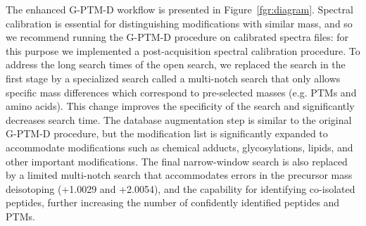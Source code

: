 \documentclass[journal=jprobs,manuscript=article]{achemso}
\begin{document}
The enhanced G-PTM-D workflow is presented in Figure~\ref{fgr:diagram}.
Spectral calibration is essential for distinguishing modifications with similar mass, and so we recommend running the G-PTM-D procedure on calibrated spectra files: for this purpose we implemented a post-acquisition spectral calibration procedure.
To address the long search times of the open search, we replaced the search in the first stage by a specialized search called a multi-notch search that only allows specific mass differences which correspond to pre-selected masses (e.g. PTMs and amino acids).
This change improves the specificity of the search and significantly decreases search time.
The database augmentation step is similar to the original G-PTM-D procedure, but the modification list is significantly expanded to accommodate modifications such as chemical adducts, glycosylations, lipids, and other important modifications.
The final narrow-window search is also replaced by a limited multi-notch search that accommodates errors in the precursor mass deisotoping (+1.0029 and +2.0054), and the capability for identifying co-isolated peptides, further increasing the number of confidently identified peptides and PTMs.
\end{document}
